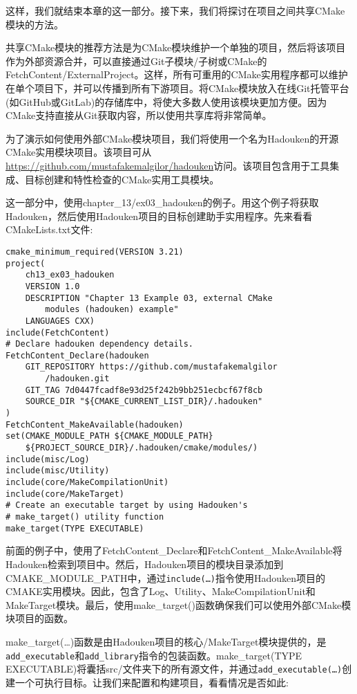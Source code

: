 这样，我们就结束本章的这一部分。接下来，我们将探讨在项目之间共享CMake模块的方法。


共享CMake模块的推荐方法是为CMake模块维护一个单独的项目，然后将该项目作为外部资源合并，可以直接通过Git子模块/子树或CMake的FetchContent/ExternalProject。这样，所有可重用的CMake实用程序都可以维护在单个项目下，并可以传播到所有下游项目。将CMake模块放入在线Git托管平台(如GitHub或GitLab)的存储库中，将使大多数人使用该模块更加方便。因为CMake支持直接从Git获取内容，所以使用共享库将非常简单。

为了演示如何使用外部CMake模块项目，我们将使用一个名为Hadouken的开源CMake实用模块项目。该项目可从\url{https://github.com/mustafakemalgilor/hadouken}访问。该项目包含用于工具集成、目标创建和特性检查的CMake实用工具模块。

这一部分中，使用chapter\_13/ex03\_hadouken的例子。用这个例子将获取Hadouken，然后使用Hadouken项目的目标创建助手实用程序。先来看看CMakeLists.txt文件:

\begin{lstlisting}[style=styleCMake]
cmake_minimum_required(VERSION 3.21)
project(
	ch13_ex03_hadouken
	VERSION 1.0
	DESCRIPTION "Chapter 13 Example 03, external CMake
		modules (hadouken) example"
	LANGUAGES CXX)
include(FetchContent)
# Declare hadouken dependency details.
FetchContent_Declare(hadouken
	GIT_REPOSITORY https://github.com/mustafakemalgilor
		/hadouken.git
	GIT_TAG 7d0447fcadf8e93d25f242b9bb251ecbcf67f8cb
	SOURCE_DIR "${CMAKE_CURRENT_LIST_DIR}/.hadouken"
)
FetchContent_MakeAvailable(hadouken)
set(CMAKE_MODULE_PATH ${CMAKE_MODULE_PATH}
	${PROJECT_SOURCE_DIR}/.hadouken/cmake/modules/)
include(misc/Log)
include(misc/Utility)
include(core/MakeCompilationUnit)
include(core/MakeTarget)
# Create an executable target by using Hadouken's
# make_target() utility function
make_target(TYPE EXECUTABLE)
\end{lstlisting}

前面的例子中，使用了FetchContent\_Declare和FetchContent\_MakeAvailable将Hadouken检索到项目中。然后，Hadouken项目的模块目录添加到CMAKE\_MODULE\_PATH中，通过\texttt{include(…)}指令使用Hadouken项目的CMAKE实用模块。因此，包含了Log、Utility、MakeCompilationUnit和MakeTarget模块。最后，使用make\_target()函数确保我们可以使用外部CMake模块项目的函数。

make\_target(…)函数是由Hadouken项目的核心/MakeTarget模块提供的，是\texttt{add\_executable}和\texttt{add\_library}指令的包装函数。make\_target(TYPE EXECUTABLE)将囊括src/文件夹下的所有源文件，并通过\texttt{add\_executable(…)}创建一个可执行目标。让我们来配置和构建项目，看看情况是否如此:

